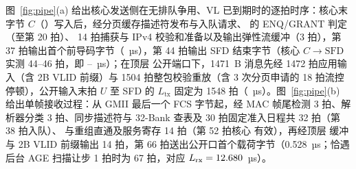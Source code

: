 图~\ref{fig:pipe}(a) 给出核心发送侧在无排队争用、VL 已到期时的逐拍时序：核心末字节 $C$（）写入后，经分页缓存描述符发布与入队请求、 的 ENQ/GRANT 判定（至第 20 拍）、 14 拍捕获与 IPv4 校验和准备以及输出弹性流缓冲（3 拍），第 37 拍输出首个前导码字节（\TtxSof~µs），第 44 拍输出 SFD 结束字节（核心 $C\to\text{SFD}$ 实测 44--46 拍，即 \TtxCore--\TtxCoreMax~µs）；在顶层  公开端口下，1471~B 消息先经 1472 拍应用输入（含 2B VLID 前缀）与  1504 拍整包校验重放（含 3 次分页申请的 18 拍流控停顿），公开输入末拍 $U$ 至 SFD 的 $L_\text{tx}$ 固定为 1548 拍（\Ttx~µs）。图~\ref{fig:pipe}(b) 给出单帧接收过程：从 GMII 最后一个 FCS 字节起，经 MAC 帧尾检测 3 拍、解析器分类 3 拍、同步描述符与 32-Bank 查表及 30 拍固定准入日程共 32 拍（第 38 拍入队）、 与重组直通及服务寄存 14 拍（第 52 拍核心  有效），再经顶层  缓冲与 2B VLID 前缀输出 14 拍，第 66 拍送出公开口首个载荷字节（0.528~µs；恰遇后台 AGE 扫描让步 1 拍时为 67 拍，对应 $L_\text{rx}=12.680$~µs）。



